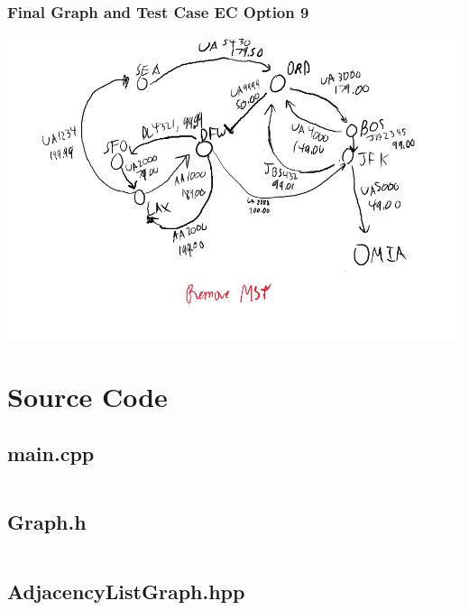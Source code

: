 \documentclass[titlepage]{article}
\begin{document}
\subsubsection{Final Graph and Test Case EC Option 9}
\includegraphics[scale=0.4]{finalGraph.png}

\newpage

\section{Source Code}
\subsection{main.cpp}
\inputminted{c++}{../../src/main.cpp}
\subsection{Graph.h}
\inputminted{c++}{../../include/Graph.h}
\subsection{AdjacencyListGraph.hpp}
\inputminted{c++}{../../include/AdjacencyListGraph.hpp}
\end{document}
